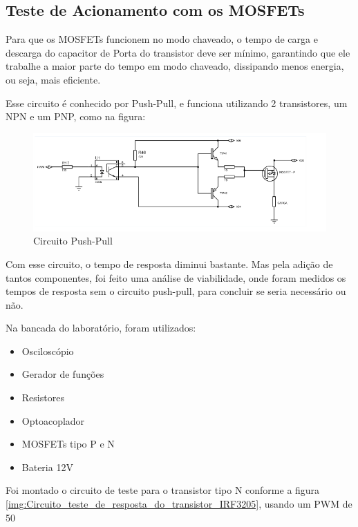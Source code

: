 	\subsection{Teste de Acionamento com os MOSFETs}
	Para que os MOSFETs funcionem no modo chaveado, o tempo de carga e descarga do capacitor de Porta do transistor deve ser mínimo, garantindo que ele trabalhe a maior parte do tempo em modo chaveado, dissipando menos energia, ou seja, mais eficiente.
	
	Esse circuito é conhecido por Push-Pull, e funciona utilizando 2 transistores, um NPN e um PNP, como na figura:
	
	\begin{figure}[!htp]
		\centering
		\includegraphics[scale=0.60]{circuito_push_pull.png}
		\caption{Circuito Push-Pull}
		\label{img:Circuito Push-Pull}
	\end{figure}
	
	Com esse circuito, o tempo de resposta diminui bastante. Mas pela adição de tantos componentes, foi feito uma análise de viabilidade, onde foram medidos os tempos de resposta sem o circuito push-pull, para concluir se seria necessário ou não.
	
	Na bancada do laboratório, foram utilizados:
	
	\begin{itemize}
		\item Osciloscópio
		\item Gerador de funções
		\item Resistores
		\item Optoacoplador
		\item MOSFETs tipo P e N
		\item Bateria 12V
	\end{itemize}
	
	Foi montado o circuito de teste para o transistor tipo N conforme a figura \ref{img:Circuito_teste_de_resposta_do_transistor_IRF3205}, usando um PWM de 50%
	
